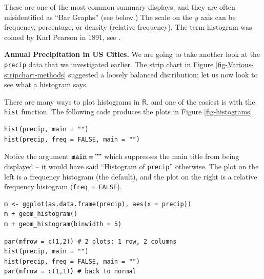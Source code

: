 \documentclass[captions=tableheading]{scrbook}
\begin{document}
These are one of the most common summary displays, and they are often misidentified as ``Bar Graphs'' (see below.) The scale on the \(y\) axis can be frequency, percentage, or density (relative frequency). The term histogram was coined by Karl Pearson in 1891, see \cite{Miller}.

\begin{example}
\textbf{Annual Precipitation in US Cities.} We are going to take another look at the \texttt{precip} data that we investigated earlier. The strip chart in Figure \ref{fig-Various-stripchart-methods} suggested a loosely balanced distribution; let us now look to see what a histogram says. 

There are many ways to plot histograms in \(\mathsf{R}\), and one of the easiest is with the \texttt{hist} function. The following code produces the plots in Figure \ref{fig-histograms}.


\begin{verbatim}
hist(precip, main = "")
hist(precip, freq = FALSE, main = "")
\end{verbatim}

Notice the argument \(\mathtt{main = ""}\) which suppresses the main title from being displayed -- it would have said ``Histogram of \texttt{precip}'' otherwise. The plot on the left is a frequency histogram (the default), and the plot on the right is a relative frequency histogram (\texttt{freq = FALSE}). 


\begin{verbatim}
m <- ggplot(as.data.frame(precip), aes(x = precip))
m + geom_histogram()
m + geom_histogram(binwidth = 5)
\end{verbatim}








\begin{verbatim}
par(mfrow = c(1,2)) # 2 plots: 1 row, 2 columns
hist(precip, main = "")
hist(precip, freq = FALSE, main = "")
par(mfrow = c(1,1)) # back to normal
\end{verbatim}


\end{example}
\end{document}
